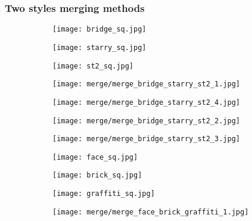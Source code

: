 \subsubsection{Two styles merging methods}
\begin{figure}[H]
	\centering
	\begin{subfigure}[b]{0.13\linewidth}
		\texttt{[image: bridge\_sq.jpg]} %
	\end{subfigure}
	\begin{subfigure}[b]{0.13\linewidth}
		\texttt{[image: starry\_sq.jpg]} %
	\end{subfigure}
	\begin{subfigure}[b]{0.13\linewidth}
		\texttt{[image: st2\_sq.jpg]} %
	\end{subfigure}
	\begin{subfigure}[b]{0.13\linewidth}
		\texttt{[image: merge/merge\_bridge\_starry\_st2\_1.jpg]} %
	\end{subfigure}
	\begin{subfigure}[b]{0.13\linewidth}
		\texttt{[image: merge/merge\_bridge\_starry\_st2\_4.jpg]} %
	\end{subfigure}
	\begin{subfigure}[b]{0.13\linewidth}
		\texttt{[image: merge/merge\_bridge\_starry\_st2\_2.jpg]} %
	\end{subfigure}
	\begin{subfigure}[b]{0.13\linewidth}
		\texttt{[image: merge/merge\_bridge\_starry\_st2\_3.jpg]} %
	\end{subfigure}
	\centering
	\begin{subfigure}[b]{0.13\linewidth}
		\texttt{[image: face\_sq.jpg]} %
	\end{subfigure}
	\begin{subfigure}[b]{0.13\linewidth}
		\texttt{[image: brick\_sq.jpg]} %
	\end{subfigure}
	\begin{subfigure}[b]{0.13\linewidth}
		\texttt{[image: graffiti\_sq.jpg]} %
	\end{subfigure}
	\begin{subfigure}[b]{0.13\linewidth}
		\texttt{[image: merge/merge\_face\_brick\_graffiti\_1.jpg]} %

\end{subfigure}
\end{figure}
